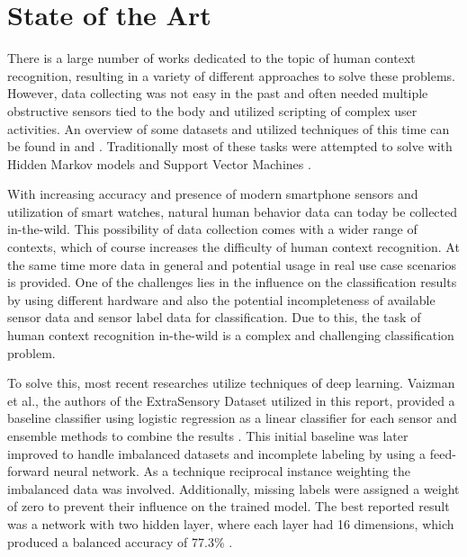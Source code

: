 \section{State of the Art}
There is a large number of works dedicated to the topic of human context recognition, resulting in a variety of different approaches to solve these problems. However, data collecting was not easy in the past and often needed multiple obstructive sensors tied to the body and utilized scripting of complex user activities. An overview of some datasets and utilized techniques of this time can be found in \cite{Ramasamy18} and \cite{Lara13}. Traditionally most of these tasks were attempted to solve with Hidden Markov models \cite{Lee11} and Support Vector Machines \cite{Anguita12}. 

With increasing accuracy and presence of modern smartphone sensors and utilization of smart watches, natural human behavior data can today be collected in-the-wild. This possibility of data collection comes with a wider range of contexts, which of course increases the difficulty of human context recognition. At the same time more data in general and potential usage in real use case scenarios is provided.  One of the challenges lies in the influence on the classification results by using different hardware \cite{Stisen15} and also the potential incompleteness of available sensor data and sensor label data for classification. Due to this, the task of human context recognition in-the-wild is a complex and challenging classification problem. 

To solve this, most recent researches utilize techniques of deep learning. Vaizman et al., the authors of the \gl ExtraSensory Dataset\gr{} utilized in this report, provided a baseline classifier using logistic regression as a linear classifier for each sensor and ensemble methods to combine the results \cite{Vaizman17}. This initial baseline was later improved to handle imbalanced datasets and incomplete labeling by using a feed-forward neural network. As a technique reciprocal instance weighting the imbalanced data was involved. Additionally, missing labels were assigned a weight of zero to prevent their influence on the trained model. The best reported result was a network with two hidden layer, where each layer had 16 dimensions, which produced a balanced accuracy of 77.3\% \cite{Vaizman18}. 

